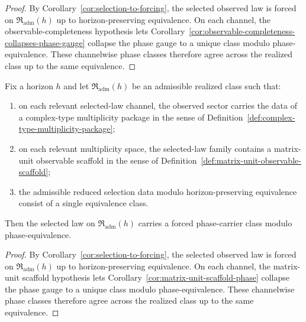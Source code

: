 \begin{proof}
By Corollary~\ref{cor:selection-to-forcing}, the selected observed law is
forced on $\mathfrak R_{\mathrm{adm}}(h)$ up to horizon-preserving
equivalence. On each channel, the observable-completeness hypothesis lets
Corollary~\ref{cor:observable-completeness-collapses-phase-gauge} collapse the
phase gauge to a unique class modulo phase-equivalence. These channelwise phase
classes therefore agree across the realized class up to the same equivalence.
\end{proof}

\begin{corollary}
\label{cor:realized-phase-from-matrix-units}
Fix a horizon $h$ and let $\mathfrak R_{\mathrm{adm}}(h)$ be an admissible
realized class such that:
\begin{enumerate}[label=(\roman*), leftmargin=2em, itemsep=0.2em]
\item on each relevant selected-law channel, the observed sector carries the
      data of a complex-type multiplicity package in the sense of
      Definition~\ref{def:complex-type-multiplicity-package};
\item on each relevant multiplicity space, the selected-law family contains a
      matrix-unit observable scaffold in the sense of
      Definition~\ref{def:matrix-unit-observable-scaffold};
\item the admissible reduced selection data modulo horizon-preserving
      equivalence consist of a single equivalence class.
\end{enumerate}
Then the selected law on $\mathfrak R_{\mathrm{adm}}(h)$ carries a forced
phase-carrier class modulo phase-equivalence.
\end{corollary}

\begin{proof}
By Corollary~\ref{cor:selection-to-forcing}, the selected observed law is
forced on $\mathfrak R_{\mathrm{adm}}(h)$ up to horizon-preserving
equivalence. On each channel, the matrix-unit scaffold hypothesis lets
Corollary~\ref{cor:matrix-unit-scaffold-phase} collapse the phase gauge to a
unique class modulo phase-equivalence. These channelwise phase classes
therefore agree across the realized class up to the same equivalence.
\end{proof}

